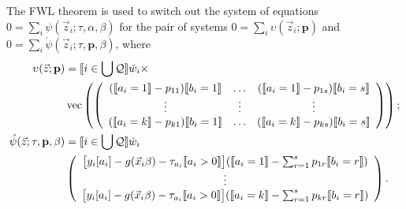 \documentclass{article}
\DeclarePairedDelimiter{\indicator}{\llbracket}{\rrbracket}
\newcommand{\owt}[1][{[a_i]}]{\ensuremath{\check{w}_{i#1}}}
\newcommand{\absorbInterceptsEF}{\upsilon}
\begin{document}
The FWL theorem is used to switch out the system of equations
$0=\sum_{i}\psi(\vec{z}_{i}; \tau, \alpha, \beta)$
for the pair of systems $0 = \sum_{i}\absorbInterceptsEF(\vec{z}_{i}; \mathbf{p})$ and
$0= \sum_{i}\acute{\psi}(\vec{z}_{i}; \tau, \mathbf{p},
\beta)$,  where
\begin{align}
  \absorbInterceptsEF(\vec{z}; \mathbf{p}) &=
                                                 \indicator{i \in \bigcup \mathcal{Q}} \owt[] \times \nonumber \\
  &\operatorname{vec}\left(%
                                                 \left(
                                                 \begin{array}{ccc}
                                                   (\indicator{a_{i}=1}-p_{11})\indicator{b_{i}=1}&\ldots&(\indicator{a_{i}=1}-p_{1s})\indicator{b_{i}=s}
                                                   \\
                                                   \vdots & \vdots &
                                                                     \vdots
                                                   \\
                                                   (\indicator{a_{i}=k}-p_{k1})\indicator{b_{i}=1}&\ldots&(\indicator{a_{i}=k}-p_{ks})\indicator{b_{i}=s}\\                                                   
                                                 \end{array}
  \right)%
  \right) ;\nonumber \\
  \acute{\psi}(\vec{z}; \tau, \mathbf{p}, \beta) &=
\indicator{i \in \bigcup \mathcal{Q}}\owt[] \nonumber \\
&\left(
                                             \begin{array}{c}                                               
           \big[y_{i}[a_{i}]
                                               -
                                               g(\vec{x}_{i}\beta)-\tau_{a_{i}}\indicator{a_{i}>0}\big](
                                               \indicator{a_{i}=1} - \sum_{r=1}^{s}p_{1r}\indicator{b_{i}=r})\\
                  \vdots \\
{}           \big[y_{i}[a_{i}]
                                               - g(\vec{x}_{i}\beta) -
                                               \tau_{a_{i}}\indicator{a_{i}>0}\big](\indicator{a_{i}=k}
                                               - \sum_{r=1}^{s}p_{kr}\indicator{b_{i}=r})\\                                             \end{array}
\right) . \label{eq:upsilondef}
\end{align}
\end{document}
